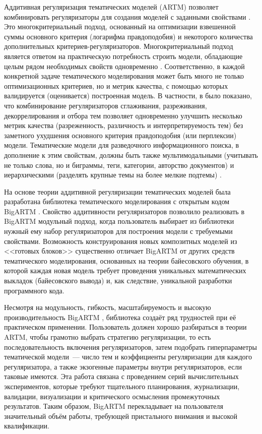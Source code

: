 Аддитивная регуляризация тематических моделей (ARTM) позволяет комбинировать регуляризаторы для создания моделей с заданными свойствами \cite{voron14dan-eng,voron15mlj}. Это многокритериальный подход, основанный на оптимизации взвешенной суммы основного критерия (логарифма правдоподобия) и некоторого количества дополнительных критериев-регуляризаторов. Многокритериальный подход является ответом на практическую потребность строить модели, обладающие целым рядом необходимых свойств одновременно \cite{kochedykov2017fast}. 
Соответственно, в каждой конкретной задаче тематического моделирования может быть много не только оптимизационных критериев, но и метрик качества, с помощью которых валидируется (оценивается) построенная модель. В частности, в \cite{voron15mlj,voron15mlj} было показано, что комбинирование регуляризаторов сглаживания, разреживания, декоррелирования и отбора тем позволяет одновременно улучшить несколько метрик качества (разреженность, различность и интерпретируемость тем) без заметного ухудшения основного критерия правдоподобия (или перплексии) модели. Тематические модели для разведочного информационного поиска, в дополнение к этим свойствам, должны быть также мультимодальными (учитывать не только слова, но и биграммы, теги, категории, авторство документов) и иерархическими (разделять крупные темы на более мелкие подтемы) \cite{ianina2019regularized}. 

На основе теории аддитивной регуляризации тематических моделей
была разработана библиотека тематического моделирования с открытым кодом BigARTM \cite{vorontsov2015bigartm,frei2016parallel}. 
Свойство аддитивности регуляризаторов позволило реализовать в BigARTM модульный подход, когда пользователь выбирает из библиотеки нужный ему набор регуляризаторов для построения модели с требуемыми свойствами. 
Возможность конструирования новых композитных моделей из <<готовых блоков>> существенно отличает BigARTM от других средств тематического моделирования, основанных на теории байесовского обучения, в которой каждая новая модель требует проведения уникальных математических выкладок (байесовского вывода) и, как следствие, уникальной разработки программного кода. 

Несмотря на модульность, гибкость, масштабируемость и высокую производительность BigARTM \cite{kochedykov2017fast}, библиотека создаёт ряд трудностей при её практическом применении. Пользователь должен хорошо разбираться в теории ARTM, чтобы грамотно выбрать стратегию регуляризации, то есть последовательность включения регуляризаторов, затем подобрать гиперпараметры тематической модели~--- число тем и коэффициенты регуляризации для каждого регуляризатора, а также экзогенные параметры внутри регуляризаторов, если таковые имеются. Эта работа связана с проведением серий вычислительных экспериментов, которые требуют тщательного планирования, журнализации, валидации, визуализации и критического осмысления промежуточных результатов. Таким образом, BigARTM перекладывает на пользователя значительный объём работы, требующей пристального внимания и высокой квалификации. 

